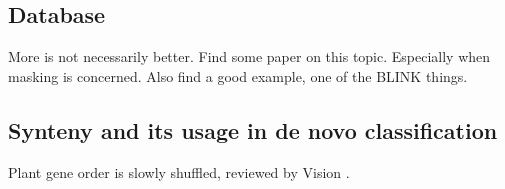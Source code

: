 \subsection{Database} More is not necessarily better. Find some paper on
this topic. Especially when masking is concerned. Also find a good example,
one of the BLINK things.

\subsection{Synteny and its usage in de novo classification}

Plant gene order is slowly shuffled, reviewed by Vision \cite{vision_gene_2005}.
